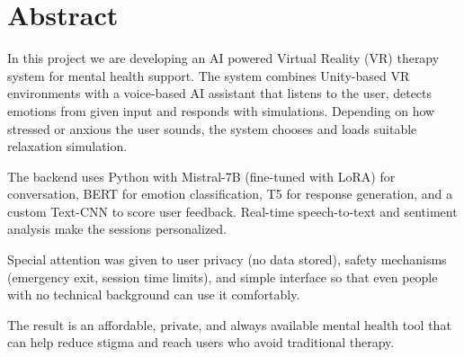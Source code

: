 \chapter*{Abstract}

In this project we are developing an AI powered Virtual Reality (VR) therapy system for mental health support. The system combines Unity-based VR environments with a voice-based AI assistant that listens to the user, detects emotions from given input and responds with simulations. Depending on how stressed or anxious the user sounds, the system chooses and loads suitable relaxation simulation.

The backend uses Python with Mistral-7B (fine-tuned with LoRA) for conversation, BERT for emotion classification, T5 for response generation, and a custom Text-CNN to score user feedback. Real-time speech-to-text and sentiment analysis make the sessions personalized.

Special attention was given to user privacy (no data stored), safety mechanisms (emergency exit,
session time limits), and simple interface so that even people with no technical background can
use it comfortably.


The result is an affordable, private, and always available mental health tool that can help reduce
stigma and reach users who avoid traditional therapy.
